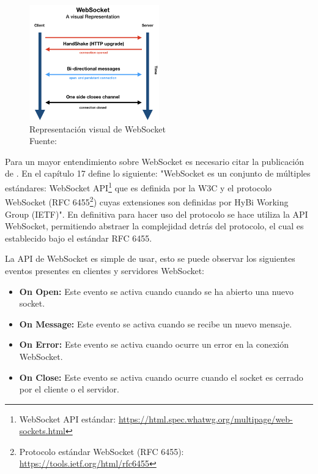 \begin{figure}[H]
  \begin{center} 
   	\includegraphics[width=0.5\textwidth]{images/chapter02/websockets-guides-transparent.png} 
    \caption[Representación visual de WebSocket]{Representación visual de WebSocket \\Fuente: \cite{websocket-pubnub}} 
    \label{fig:WebSocket}
  \end{center}
\end{figure}

Para un mayor entendimiento sobre WebSocket es necesario citar la publicación de \cite{websocket-oreilly}. En el capítulo 17 define lo siguiente: "WebSocket es un conjunto de múltiples estándares: WebSocket API\footnote{WebSocket API estándar: \url{https://html.spec.whatwg.org/multipage/web-sockets.html}} que es definida por la W3C y el protocolo WebSocket (RFC 6455\footnote{Protocolo estándar WebSocket (RFC 6455): \url{https://tools.ietf.org/html/rfc6455} }) cuyas extensiones son definidas por HyBi Working Group (IETF)". En definitiva para hacer uso del protocolo se hace utiliza la API  WebSocket, permitiendo abstraer la complejidad detrás del protocolo, el cual es establecido bajo el estándar RFC 6455.

La API de WebSocket es simple de usar, esto se puede observar los siguientes eventos presentes en clientes y servidores WebSocket:

\begin{itemize}
		\item \textbf{On Open:} Este evento se activa cuando cuando se ha abierto una nuevo socket.
		\item \textbf{On Message:} Este evento se activa cuando se recibe un nuevo mensaje.
		\item \textbf{On Error:} Este evento se activa cuando ocurre un error en la conexión WebSocket.
		\item \textbf{On Close: }Este evento se activa cuando ocurre cuando el socket es cerrado por el cliente o el servidor. 
\end{itemize}




